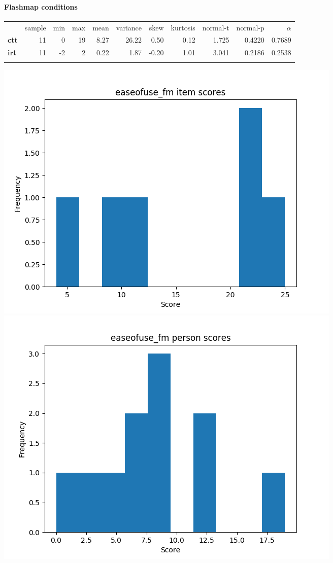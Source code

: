 \documentclass[]{article}
\begin{document}
\FloatBarrier
\paragraph{Flashmap conditions}\label{flashmap-conditions-6}

\begin{longtable}[c]{@{}lrrrrrrrrrr@{}}
\toprule\addlinespace
& sample & min & max & mean & variance & skew & kurtosis & normal-t &
normal-p & $\alpha$
\\\addlinespace
\midrule\endhead
\textbf{ctt} & 11 & 0 & 19 & 8.27 & 26.22 & 0.50 & 0.12 & 1.725 & 0.4220
& 0.7689
\\\addlinespace
\textbf{irt} & 11 & -2 & 2 & 0.22 & 1.87 & -0.20 & 1.01 & 3.041 & 0.2186
& 0.2538
\\\addlinespace
\bottomrule
\end{longtable}

\includegraphics{easeofuse_fm_diff.png}
\includegraphics{easeofuse_fm_abil.png}
\end{document}
